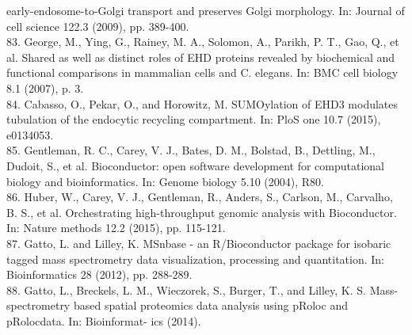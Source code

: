 \documentclass[12pt,english]{article}
\begin{document}
early-endosome-to-Golgi transport and preserves Golgi morphology. In: Journal
of cell science 122.3 (2009), pp. 389-400.
\\
83. George, M., Ying, G., Rainey, M. A., Solomon, A., Parikh, P. T., Gao, Q., et al.
Shared as well as distinct roles of EHD proteins revealed by biochemical and functional
comparisons in mammalian cells and C. elegans. In: BMC cell biology 8.1 (2007), p. 3.
\\
84. Cabasso, O., Pekar, O., and Horowitz, M. SUMOylation of EHD3 modulates tubulation
of the endocytic recycling compartment. In: PloS one 10.7 (2015), e0134053.
\\
85. Gentleman, R. C., Carey, V. J., Bates, D. M., Bolstad, B., Dettling, M., Dudoit, S.,
et al. Bioconductor: open software development for computational biology and bioinformatics. In: Genome biology 5.10 (2004), R80.
\\
86. Huber, W., Carey, V. J., Gentleman, R., Anders, S., Carlson, M., Carvalho, B. S.,
et al. Orchestrating high-throughput genomic analysis with Bioconductor. In: Nature
methods 12.2 (2015), pp. 115-121.
\\
87. Gatto, L. and Lilley, K. MSnbase - an R/Bioconductor package for isobaric tagged
mass spectrometry data visualization, processing and quantitation. In: Bioinformatics
28 (2012), pp. 288-289.
\\
88. Gatto, L., Breckels, L. M., Wieczorek, S., Burger, T., and Lilley, K. S. Mass-spectrometry
based spatial proteomics data analysis using pRoloc and pRolocdata. In: Bioinformat-
ics (2014).

\end{document}
